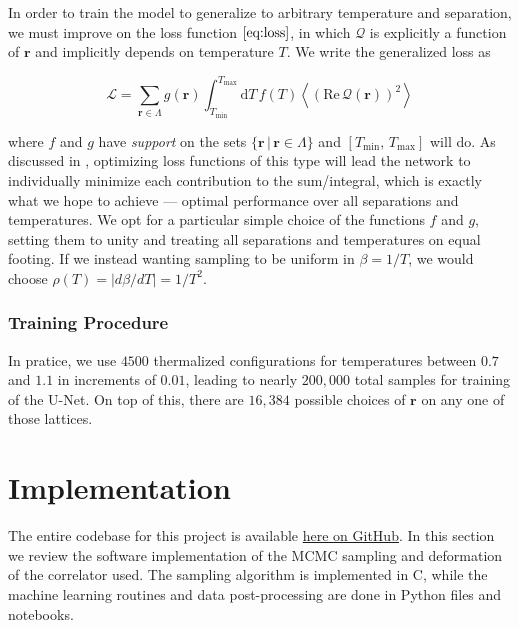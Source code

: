\documentclass[12pt]{article}
\begin{document}
In order to train the model to generalize to arbitrary temperature and separation, we must improve on the loss function $\ref{eq:loss}$, in which $\mathcal{Q}$
is explicitly a function of $\mathbf{r}$ and implicitly depends on temperature $T$. We write the generalized loss as

\begin{equation}
	\mathcal{L} = \sum_{\mathbf{r}\in\Lambda}g(\mathbf{r})\int_{T_{\min}}^{T_{\max}}\mathrm{d}T\, f(T)\left\langle \left(\mathrm{Re}\,\mathcal{Q}(\mathbf{r})\right)^2 \right\rangle
\end{equation}

where $f$ and $g$ have \textit{support} on the sets $\{\mathbf{r} \,|\, \mathbf{r} \in \Lambda \}$
and $[T_{\min},\,T_{\max}]$ will do. As discussed in \cite{albergo2025netsnonequilibriumtransportsampler}, optimizing loss functions of this type will lead the network 
to individually minimize each contribution to the sum/integral, which is exactly what we hope to achieve --- optimal performance over all separations and temperatures. We opt 
for a particular simple choice of the functions $f$ and $g$, setting them to unity and treating all separations and temperatures on equal footing. If we instead wanting sampling
to be uniform in $\beta=1/T$, we would choose $\rho(T)=\left| d\beta/dT \right|=1/T^2$.

\subsubsection{Training Procedure}

In pratice, we use $4500$ thermalized configurations for temperatures between $0.7$ and $1.1$ in increments of $0.01$, leading to nearly $200,000$ total samples for training of the U-Net.
On top of this, there are $16,384$ possible choices of $\mathbf{r}$ on any one of those lattices.

\section{Implementation}

The entire codebase for this project is available \href{https://github.com/amshak01/XY-Contour-Deformations}{here on GitHub}. In this
section we review the software implementation of the MCMC sampling and deformation of the correlator used. The sampling algorithm
is implemented in C, while the machine learning routines and data post-processing are done in Python files and notebooks.
\end{document}
